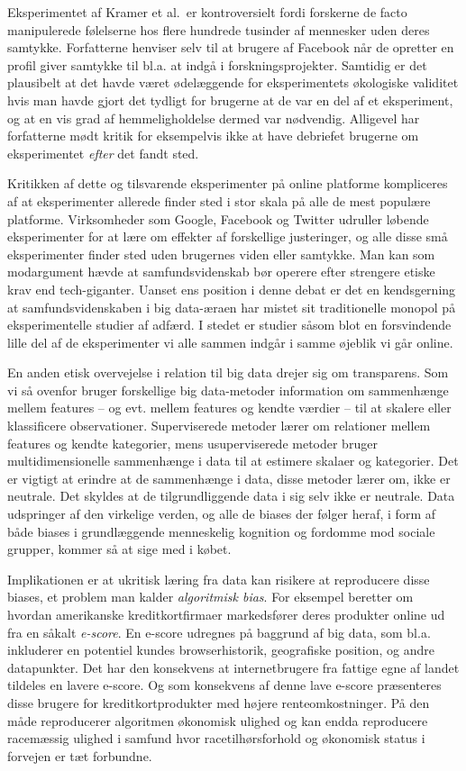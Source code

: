 \documentclass[12pt,]{article}
\begin{document}
Eksperimentet af Kramer et al.~er kontroversielt fordi forskerne de
facto manipulerede følelserne hos flere hundrede tusinder af mennesker
uden deres samtykke. Forfatterne henviser selv til at brugere af
Facebook når de opretter en profil giver samtykke til bl.a. at indgå i
forskningsprojekter. Samtidig er det plausibelt at det havde været
ødelæggende for eksperimentets økologiske validitet hvis man havde gjort
det tydligt for brugerne at de var en del af et eksperiment, og at en
vis grad af hemmeligholdelse dermed var nødvendig. Alligevel har
forfatterne mødt kritik for eksempelvis ikke at have debriefet brugerne
om eksperimentet \emph{efter} det fandt sted.

Kritikken af dette og tilsvarende eksperimenter på online platforme
kompliceres af at eksperimenter allerede finder sted i stor skala på
alle de mest populære platforme. Virksomheder som Google, Facebook og
Twitter udruller løbende eksperimenter for at lære om effekter af
forskellige justeringer, og alle disse små eksperimenter finder sted
uden brugernes viden eller samtykke. Man kan som modargument hævde at
samfundsvidenskab bør operere efter strengere etiske krav end
tech-giganter. Uanset ens position i denne debat er det en kendsgerning
at samfundsvidenskaben i big data-æraen har mistet sit traditionelle
monopol på eksperimentelle studier af adfærd. I stedet er studier såsom
\citet{kramer2014experimental} blot en forsvindende lille del af de
eksperimenter vi alle sammen indgår i samme øjeblik vi går online.

En anden etisk overvejelse i relation til big data drejer sig om
transparens. Som vi så ovenfor bruger forskellige big data-metoder
information om sammenhænge mellem features -- og evt. mellem features og
kendte værdier -- til at skalere eller klassificere observationer.
Superviserede metoder lærer om relationer mellem features og kendte
kategorier, mens usuperviserede metoder bruger multidimensionelle
sammenhænge i data til at estimere skalaer og kategorier. Det er vigtigt
at erindre at de sammenhænge i data, disse metoder lærer om, ikke er
neutrale. Det skyldes at de tilgrundliggende data i sig selv ikke er
neutrale. Data udspringer af den virkelige verden, og alle de biases der
følger heraf, i form af både biases i grundlæggende menneskelig
kognition og fordomme mod sociale grupper, kommer så at sige med i
købet.

Implikationen er at ukritisk læring fra data kan risikere at reproducere
disse biases, et problem man kalder \emph{algoritmisk bias}. For
eksempel beretter \citet{oneill16} om hvordan amerikanske
kreditkortfirmaer markedsfører deres produkter online ud fra en såkalt
\emph{e-score}. En e-score udregnes på baggrund af big data, som bl.a.
inkluderer en potentiel kundes browserhistorik, geografiske position, og
andre datapunkter. Det har den konsekvens at internetbrugere fra fattige
egne af landet tildeles en lavere e-score. Og som konsekvens af denne
lave e-score præsenteres disse brugere for kreditkortprodukter med
højere renteomkostninger. På den måde reproducerer algoritmen økonomisk
ulighed og kan endda reproducere racemæssig ulighed i samfund hvor
racetilhørsforhold og økonomisk status i forvejen er tæt forbundne.
\end{document}
